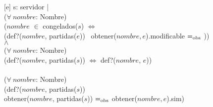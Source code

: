 \begin{Representacion}
    [e]{
        s: servidor | \\
            \tab ($\forall\ nombre$: Nombre)\\
                \tab\tab ($nombre$ $\in$ congelados($s$) $\Leftrightarrow$ \\
                \tab\tab (def?($nombre$, partidas($e$)) \yluego\ obtener($nombre, e$).modificable $=_{\mathrm{obs}}$ \false)) \\
            \tab $\wedge$ \\
            \tab ($\forall\ nombre$: Nombre)\\
                \tab\tab (def?($nombre$, partidas($s$)) $\Leftrightarrow$ def?($nombre$, $e$)) \\
            \tab \yluego \\
            \tab ($\forall\ nombre$: Nombre)\\
                \tab\tab (def?($nombre$, partidas($s$)) \impluego \\ 
                \tab\tab  obtener($nombre$, partidas($s$)) $=_{\mathrm{obs}}$ obtener($nombre, e$).sim) \\
    }
  
  \end{Representacion}